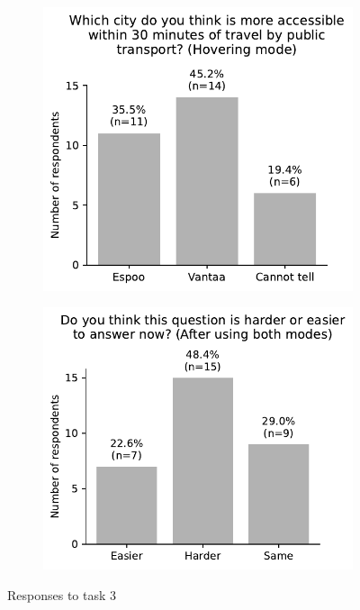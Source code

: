 \begin{appendices}
\begin{figure}[H]
	\centering
	\begin{subfigure}[b]{0.5\textwidth}
		\centering
		\includegraphics[width=\textwidth]{visual/figures/survey/3.pdf}
	\end{subfigure}%
	\hfill
	\begin{subfigure}[b]{0.5\textwidth}
		\centering
		\includegraphics[width=\textwidth]{visual/figures/survey/4.pdf}
	\end{subfigure}%
	\caption{Responses to task 3}
	\label{fig:task 3}
\end{figure}


\end{appendices}
